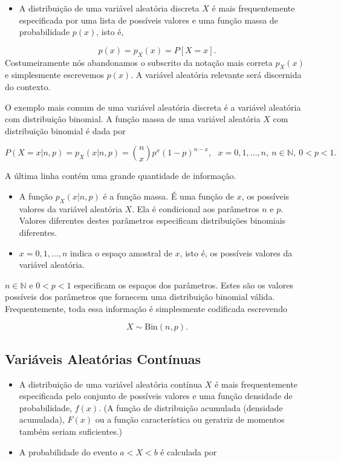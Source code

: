 \documentclass[]{article}
\providecommand{\tightlist}{%
  \setlength{\itemsep}{0pt}\setlength{\parskip}{0pt}}
\begin{document}
\begin{itemize}
\tightlist
\item
  A distribuição de uma variável aleatória discreta \(X\) é mais
  frequentemente especificada por uma lista de possíveis valores e uma
  função massa de probabilidade \(p(x)\), isto é,
\end{itemize}

\[ p(x) = p_X(x) = P[X = x]. \] Costumeiramente nós abandonamos o
subscrito da notação mais correta \(p_X(x)\) e simplesmente escrevemos
\(p(x)\). A variável aleatória relevante será discernida do contexto.

O exemplo mais comum de uma variável aleatória discreta é a variável
aleatória com distribuição binomial. A função massa de uma variável
aleatória \(X\) com distribuição binomial é dada por

\[ P(X = x | n, p) = p_X(x | n, p) = {n \choose x} p^x(1 - p)^{n - x}, \ \ \ x = 0, 1, \ldots, n, \ n \in \mathbb{N}, \ 0 < p < 1. \]

A última linha contém uma grande quantidade de informação.

\begin{itemize}
\item
  A função \(p_X(x | n, p)\) é a função massa. É uma função de \(x\), os
  possíveis valores da variável aleatória \(X\). Ela é condicional aos
  parâmetros \(n\) e \(p\). Valores diferentes destes parâmetros
  especificam distribuições binomiais diferentes.
\item
  \(x = 0, 1, \ldots, n\) indica o espaço amostral de \(x\), isto é, os
  possíveis valores da variável aleatória.
\end{itemize}

\(n \in \mathbb{N}\) e \(0 < p < 1\) especificam os espaços dos
parâmetros. Estes são os valores possíveis dos parâmetros que fornecem
uma distribuição binomial válida. Frequentemente, toda essa informação é
simplesmente codificada escrevendo

\[ X \sim \text{Bin}(n, p). \]

\subsection{Variáveis Aleatórias
Contínuas}\label{variaveis-aleatorias-continuas}

\begin{itemize}
\item
  A distribuição de uma variável aleatória contínua \(X\) é mais
  frequentemente especificada pelo conjunto de possíveis valores e uma
  função densidade de probabilidade, \(f(x)\). (A função de distribuição
  acumulada (densidade acumulada), \(F(x)\) ou a função característica
  ou geratriz de momentos também seriam suficientes.)
\item
  A probabilidade do evento \(a < X < b\) é calculada por
\end{itemize}
\end{document}
